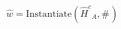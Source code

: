 \documentclass[border=1pt]{standalone}
\begin{document}
${\hat{w}}=\text{Instantiate}({{\hat{H}^c}}{_{A}}, {{\#}}{_{}})$
\end{document}
